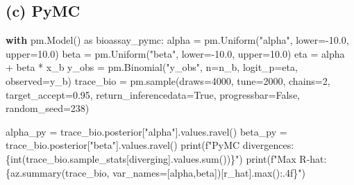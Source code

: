 \documentclass[
  letterpaper,
  DIV=11,
  numbers=noendperiod]{scrartcl}
\newenvironment{Shaded}{\begin{snugshade}}{\end{snugshade}}
\newcommand{\BuiltInTok}[1]{\textcolor[rgb]{0.00,0.23,0.31}{#1}}
\newcommand{\ControlFlowTok}[1]{\textcolor[rgb]{0.00,0.23,0.31}{\textbf{#1}}}
\newcommand{\DecValTok}[1]{\textcolor[rgb]{0.68,0.00,0.00}{#1}}
\newcommand{\FloatTok}[1]{\textcolor[rgb]{0.68,0.00,0.00}{#1}}
\newcommand{\ImportTok}[1]{\textcolor[rgb]{0.00,0.46,0.62}{#1}}
\newcommand{\NormalTok}[1]{\textcolor[rgb]{0.00,0.23,0.31}{#1}}
\newcommand{\OperatorTok}[1]{\textcolor[rgb]{0.37,0.37,0.37}{#1}}
\newcommand{\SpecialCharTok}[1]{\textcolor[rgb]{0.37,0.37,0.37}{#1}}
\newcommand{\SpecialStringTok}[1]{\textcolor[rgb]{0.13,0.47,0.30}{#1}}
\newcommand{\StringTok}[1]{\textcolor[rgb]{0.13,0.47,0.30}{#1}}
\newcommand{\VariableTok}[1]{\textcolor[rgb]{0.07,0.07,0.07}{#1}}
\begin{document}
\subsection{(c) PyMC}\label{c-pymc-1}

\begin{Shaded}
\begin{Highlighting}[]
\ControlFlowTok{with}\NormalTok{ pm.Model() }\ImportTok{as}\NormalTok{ bioassay\_pymc:}
\NormalTok{    alpha }\OperatorTok{=}\NormalTok{ pm.Uniform(}\StringTok{"alpha"}\NormalTok{, lower}\OperatorTok{={-}}\FloatTok{10.0}\NormalTok{, upper}\OperatorTok{=}\FloatTok{10.0}\NormalTok{)}
\NormalTok{    beta  }\OperatorTok{=}\NormalTok{ pm.Uniform(}\StringTok{"beta"}\NormalTok{,  lower}\OperatorTok{={-}}\FloatTok{10.0}\NormalTok{, upper}\OperatorTok{=}\FloatTok{10.0}\NormalTok{)}
\NormalTok{    eta   }\OperatorTok{=}\NormalTok{ alpha }\OperatorTok{+}\NormalTok{ beta }\OperatorTok{*}\NormalTok{ x\_b}
\NormalTok{    y\_obs }\OperatorTok{=}\NormalTok{ pm.Binomial(}\StringTok{"y\_obs"}\NormalTok{, n}\OperatorTok{=}\NormalTok{n\_b, logit\_p}\OperatorTok{=}\NormalTok{eta, observed}\OperatorTok{=}\NormalTok{y\_b)}
\NormalTok{    trace\_bio }\OperatorTok{=}\NormalTok{ pm.sample(draws}\OperatorTok{=}\DecValTok{4000}\NormalTok{, tune}\OperatorTok{=}\DecValTok{2000}\NormalTok{, chains}\OperatorTok{=}\DecValTok{2}\NormalTok{,}
\NormalTok{                          target\_accept}\OperatorTok{=}\FloatTok{0.95}\NormalTok{, return\_inferencedata}\OperatorTok{=}\VariableTok{True}\NormalTok{,}
\NormalTok{                          progressbar}\OperatorTok{=}\VariableTok{False}\NormalTok{, random\_seed}\OperatorTok{=}\DecValTok{238}\NormalTok{)}

\NormalTok{alpha\_py }\OperatorTok{=}\NormalTok{ trace\_bio.posterior[}\StringTok{"alpha"}\NormalTok{].values.ravel()}
\NormalTok{beta\_py  }\OperatorTok{=}\NormalTok{ trace\_bio.posterior[}\StringTok{"beta"}\NormalTok{].values.ravel()}
\BuiltInTok{print}\NormalTok{(}\SpecialStringTok{f"PyMC divergences: }\SpecialCharTok{\{}\BuiltInTok{int}\NormalTok{(trace\_bio.sample\_stats[}\StringTok{\textquotesingle{}diverging\textquotesingle{}}\NormalTok{].values.}\BuiltInTok{sum}\NormalTok{())}\SpecialCharTok{\}}\SpecialStringTok{"}\NormalTok{)}
\BuiltInTok{print}\NormalTok{(}\SpecialStringTok{f"Max R{-}hat: }\SpecialCharTok{\{}\NormalTok{az}\SpecialCharTok{.}\NormalTok{summary(trace\_bio, var\_names}\OperatorTok{=}\NormalTok{[}\StringTok{\textquotesingle{}alpha\textquotesingle{}}\NormalTok{,}\StringTok{\textquotesingle{}beta\textquotesingle{}}\NormalTok{])[}\StringTok{\textquotesingle{}r\_hat\textquotesingle{}}\NormalTok{]}\SpecialCharTok{.}\BuiltInTok{max}\NormalTok{()}\SpecialCharTok{:.4f\}}\SpecialStringTok{"}\NormalTok{)}


\end{Highlighting}
\end{Shaded}
\end{document}
